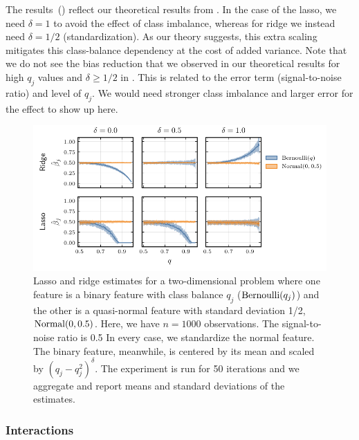 The results~() reflect our theoretical results from
. In the case of the lasso, we need \(\delta =1\) to avoid the effect of
class imbalance, whereas for ridge we instead need \(\delta =1/2\) (standardization). As
our theory suggests, this extra scaling mitigates this class-balance dependency at the cost
of added variance. Note that we do not see the bias reduction that we observed in our
theoretical results for high \(q_j\) values and \(\delta \geq 1/2\) in
. This is related to the error term (signal-to-noise
ratio) and level of \(q_j\). We would need stronger class imbalance and larger error for
the effect to show up here.

\begin{figure}[htpb]
  \centering
  \includegraphics{plots/mixed_data.pdf}
  \caption{%
    Lasso and ridge estimates for a two-dimensional problem where one feature is a binary
    feature with class balance \(q_j\) (\(\operatorname{Bernoulli}(q_j)\)) and the other is a quasi-normal
    feature with standard deviation 1/2, \(\operatorname{Normal}(0, 0.5)\). Here, we have \(n = \num{1000}\)
    observations. The signal-to-noise ratio is 0.5 In every case, we standardize the normal
    feature. The binary feature, meanwhile, is centered by its mean and scaled by
    \((q_j-q_j^2)^\delta\). The experiment is run for 50 iterations and we aggregate and report
    means and standard deviations of the estimates.\label{fig:lasso-ridge-comparison}
  }
\end{figure}

\subsubsection{Interactions}\label{sec:experiments-interactions}

